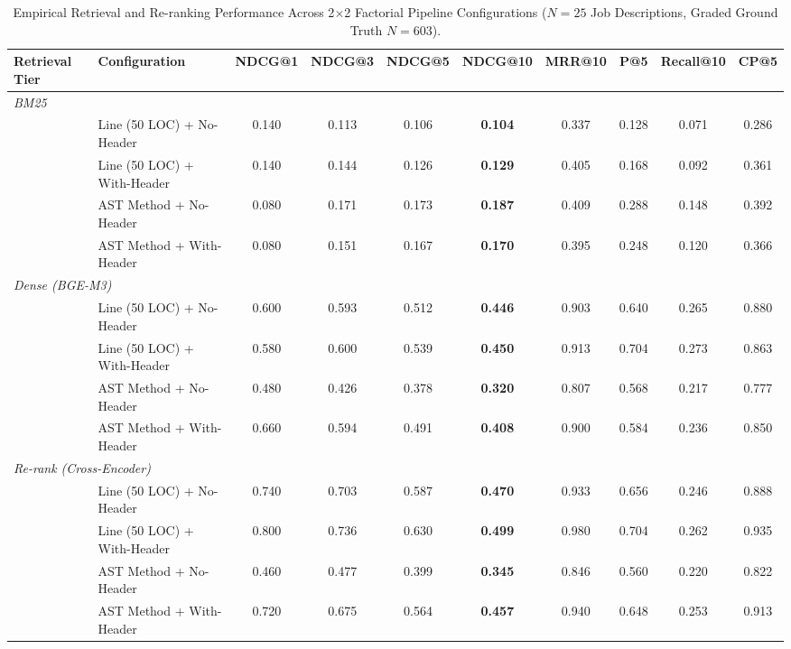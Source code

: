 \begin{table}[t]
\centering
\small
\caption{Empirical Retrieval and Re-ranking Performance Across 2$\times$2 Factorial Pipeline Configurations ($N=25$ Job Descriptions, Graded Ground Truth $N=603$).}
\label{tab:retrieval_2x2}
\begin{tabular}{llcccccccc}
\toprule
\textbf{Retrieval Tier} & \textbf{Configuration} & \textbf{NDCG@1} & \textbf{NDCG@3} & \textbf{NDCG@5} & \textbf{NDCG@10} & \textbf{MRR@10} & \textbf{P@5} & \textbf{Recall@10} & \textbf{CP@5} \\
\midrule
\multicolumn{10}{l}{\textit{BM25}} \\
  & Line (50 LOC) + No-Header      & 0.140 & 0.113 & 0.106 & \textbf{0.104} & 0.337 & 0.128 & 0.071 & 0.286 \\
  & Line (50 LOC) + With-Header    & 0.140 & 0.144 & 0.126 & \textbf{0.129} & 0.405 & 0.168 & 0.092 & 0.361 \\
  & AST Method + No-Header         & 0.080 & 0.171 & 0.173 & \textbf{0.187} & 0.409 & 0.288 & 0.148 & 0.392 \\
  & AST Method + With-Header       & 0.080 & 0.151 & 0.167 & \textbf{0.170} & 0.395 & 0.248 & 0.120 & 0.366 \\
\midrule
\multicolumn{10}{l}{\textit{Dense (BGE-M3)}} \\
  & Line (50 LOC) + No-Header      & 0.600 & 0.593 & 0.512 & \textbf{0.446} & 0.903 & 0.640 & 0.265 & 0.880 \\
  & Line (50 LOC) + With-Header    & 0.580 & 0.600 & 0.539 & \textbf{0.450} & 0.913 & 0.704 & 0.273 & 0.863 \\
  & AST Method + No-Header         & 0.480 & 0.426 & 0.378 & \textbf{0.320} & 0.807 & 0.568 & 0.217 & 0.777 \\
  & AST Method + With-Header       & 0.660 & 0.594 & 0.491 & \textbf{0.408} & 0.900 & 0.584 & 0.236 & 0.850 \\
\midrule
\multicolumn{10}{l}{\textit{Re-rank (Cross-Encoder)}} \\
  & Line (50 LOC) + No-Header      & 0.740 & 0.703 & 0.587 & \textbf{0.470} & 0.933 & 0.656 & 0.246 & 0.888 \\
  & Line (50 LOC) + With-Header    & 0.800 & 0.736 & 0.630 & \textbf{0.499} & 0.980 & 0.704 & 0.262 & 0.935 \\
  & AST Method + No-Header         & 0.460 & 0.477 & 0.399 & \textbf{0.345} & 0.846 & 0.560 & 0.220 & 0.822 \\
  & AST Method + With-Header       & 0.720 & 0.675 & 0.564 & \textbf{0.457} & 0.940 & 0.648 & 0.253 & 0.913 \\

\end{tabular}
\end{table}

